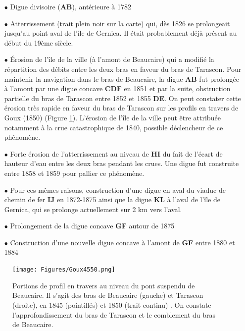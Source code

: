 \documentclass[11pt]{article}
\begin{document}
        \begin{itemize}
            \item[$\bullet$] Digue divisoire (\textbf{AB}), antérieure à 1782
            \item[$\bullet$] Atterrissement (trait plein noir sur la carte) qui, dès 1826 se prolongeait jusqu'au point aval de l'île de Gernica. Il était probablement déjà présent au début du 19ème siècle.
            \item[$\bullet$] Érosion de l'île de la ville (à l'amont de Beaucaire) qui a modifié la répartition des débits entre les deux bras en faveur du bras de Tarascon. Pour maintenir la navigation dans le bras de Beaucaire, la digue \textbf{AB} fut prolongée à l'amont par une digue concave \textbf{CDF} en 1851 et par la suite, obstruction partielle du bras de Tarascon entre 1852 et 1855 \textbf{DE}. On peut constater cette érosion très rapide en faveur du bras de Tarascon sur les profils en travers de Goux (1850) (Figure \ref{fig:ProfGoux}). L'érosion de l'île de la ville peut être attribuée notamment à la crue catastrophique de 1840, possible déclencheur de ce phénomène.
            \item[$\bullet$] Forte érosion de l'atterrissement au niveau de \textbf{HI} du fait de l'écart de hauteur d'eau entre les deux bras pendant les crues. Une digue fut construite entre 1858 et 1859 pour pallier ce phénomène.
            \item[$\bullet$] Pour ces mêmes raisons, construction d'une digue en aval du viaduc de chemin de fer \textbf{IJ} en 1872-1875 ainsi que la digue \textbf{KL} à l'aval de l'île de Gernica, qui se prolonge actuellement sur 2 km vers l'aval.
            \item[$\bullet$] Prolongement de la digue concave \textbf{GF} autour de 1875
            \item[$\bullet$] Construction d'une nouvelle digue concave à l'amont de \textbf{GF} entre 1880 et 1884
        \end{itemize}

        \begin{figure}[h]
            \centering
            \texttt{[image: Figures/Goux4550.png]}
            \caption{Portions de profil en travers au niveau du pont suspendu de Beaucaire. Il s'agit des bras de Beaucaire (gauche) et Tarascon (droite), en 1845 (pointillés) et 1850 (trait continu) \citep{goux_modification_1851}. On constate l'approfondissement du bras de Tarascon et le comblement du bras de Beaucaire.}
            \label{fig:ProfGoux}
        \end{figure}
%            
            
\end{document}
